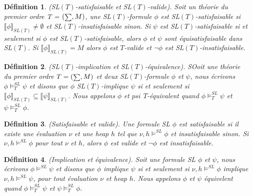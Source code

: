\documentclass[9pt]{book}
\newcommand\phibra{\llbracket\phi\rrbracket}
\newcommand\psibra{\llbracket\psi\rrbracket}
\newcommand\smallsum{\mathsmaller\sum}
\newtheorem{definition}{D\'efinition}[section]
\begin{document}
\begin{definition}
(SL$(T)$-satisfaisable et SL$(T)$-valide). Soit un th\'eorie du premier ordre T = $(\smallsum,M)$, une SL$(T)$-formule $\phi$ est SL$(T)$-satisfaisable si $\phibra_{SL(T)}\neq\emptyset$ et SL$(T)$-insatisfaisable sinon. Si $\psi$ est SL$(T)$-satisfaisable si et seulement si $\phi$ est SL$(T)$-satisfaisable, alors $\phi$ et $\psi$ sont \textit{\'equisatisfaisable} dans SL$(T)$. Si $\phibra_{SL(T)}=M$ alors $\phi$ est $T$-valide et $\neg\phi$ est SL$(T)$-insatisfaisable.
\end{definition}

\begin{definition}
(SL$(T)$-implication et SL$(T)$-\'equivalence). SOoit une th\'eorie du premier ordre $T=(\smallsum,M)$ et deux SL$(T)$-formule $\phi$ et $\psi$, nous \'ecrivons $\phi\models^{SL}_{T}\psi$ et disons que $\phi$ SL$(T)$-implique $\psi$ si et seulement si $\phibra_{SL(T)}\subseteq\psibra_{SL(T)}$. Nous appelons $\phi$ et $psi$ $T$-\'equivalent quand  $\phi\models^{SL}_{T}\psi$ et $\psi\models^{SL}_{T}\phi$. 
\end{definition}

\begin{definition}
(Satisfaisable et valide). Une formule SL $\phi$ est satisfaisable si il existe une \'evaluation $\nu$ et une heap $h$ tel que $\nu,h\models^{SL}\phi$ et \textit{insatisfaisable} sinon. Si $\nu,h\models^{SL}\phi$ pour tout $\nu$ et $h$, alors $\phi$ est valide et $\neg\phi$ est insatisfaisable.
\end{definition}

\begin{definition}
(Implication et \'equivalence). Soit une formule SL $\phi$ et $\psi$, nous \'ecrivons $\phi\models^{SL}\psi$ et disons que $\phi$ implique $\psi$ si et seulement si $\nu,h\models^{SL}\phi$ implique $\nu,h\models^{SL}\psi$, pour tout \'evaluation $\nu$ et heap $h$. Nous appelons $\phi$ et $\psi$ \'equivelent quand $\phi\models^{SL}_{T}\psi$ et $\psi\models^{SL}_{T}\phi$. 
\end{definition}
\end{document}
